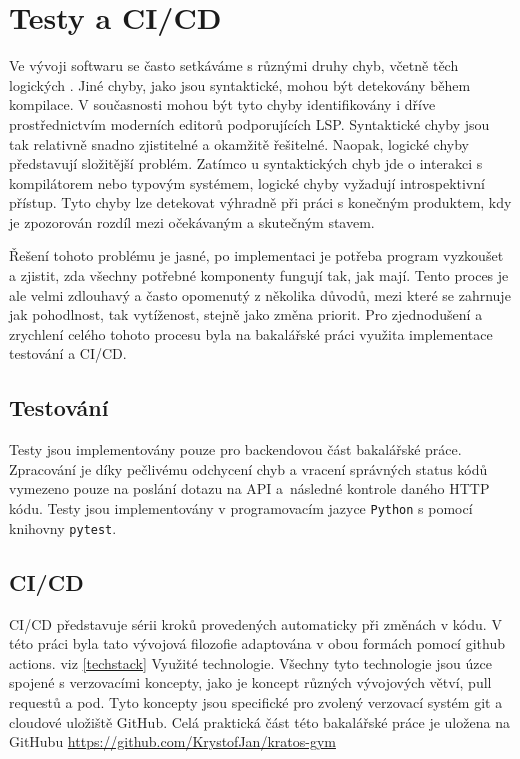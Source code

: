 \chapter{Testy a CI/CD} \label{testing&cicd}
Ve vývoji softwaru se často setkáváme s různými druhy chyb, včetně těch logických \cite{alzahrani2021common}. Jiné chyby, jako jsou syntaktické, mohou být detekovány během kompilace. V současnosti mohou být tyto chyby identifikovány i dříve prostřednictvím moderních editorů podporujících LSP. Syntaktické chyby jsou tak relativně snadno zjistitelné a okamžitě řešitelné. Naopak, logické chyby představují složitější problém. Zatímco u syntaktických chyb jde o interakci s kompilátorem nebo typovým systémem, logické chyby vyžadují introspektivní přístup. Tyto chyby lze detekovat výhradně při práci s konečným produktem, kdy je zpozorován rozdíl mezi očekávaným a skutečným stavem.

Řešení tohoto problému je jasné, po implementaci je potřeba program vyzkoušet a zjistit, zda všechny potřebné komponenty fungují tak, jak mají. Tento proces je ale velmi zdlouhavý a často opomenutý z několika důvodů, mezi které se zahrnuje jak pohodlnost, tak vytíženost, stejně jako změna priorit. Pro zjednodušení a zrychlení celého tohoto procesu byla na bakalářské práci využita implementace testování a CI/CD.

\section{Testování}
Testy jsou implementovány pouze pro backendovou část bakalářské práce. Zpracování je díky pečlivému odchycení chyb a vracení správných status kódů vymezeno pouze na poslání dotazu na API a~následné kontrole daného HTTP kódu. Testy jsou implementovány v programovacím jazyce \texttt{Python} s pomocí knihovny \texttt{pytest}.

\section{CI/CD}
CI/CD představuje sérii kroků provedených automaticky při změnách v kódu. V této práci byla tato vývojová filozofie adaptována v obou formách pomocí github actions. viz \ref{techstack} Využité technologie. Všechny tyto technologie jsou úzce spojené s verzovacími koncepty, jako je koncept různých vývojových větví, pull requestů a pod. Tyto koncepty jsou specifické pro zvolený verzovací systém git a cloudové uložiště GitHub. Celá praktická část této bakalářské práce je uložena na GitHubu \url{https://github.com/KrystofJan/kratos-gym}

